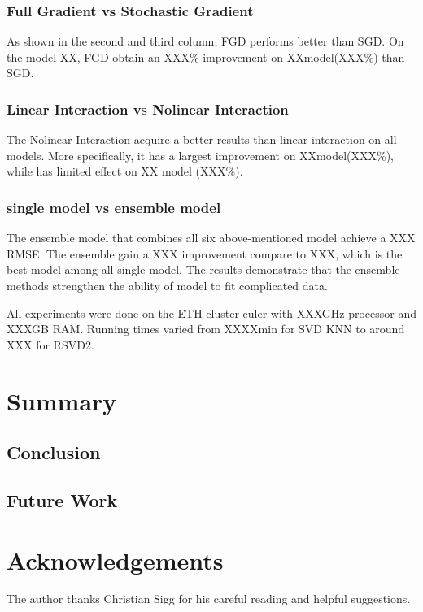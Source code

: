 \documentclass[10pt,conference,compsocconf]{IEEEtran}
\begin{document}
\subsubsection{Full Gradient vs Stochastic Gradient}
As shown in the second and third column, FGD performs better than SGD. On the model XX, FGD obtain an XXX\% improvement on XXmodel(XXX\%) than SGD. 

\subsubsection{Linear Interaction vs Nolinear Interaction}
The Nolinear Interaction acquire a better results than linear interaction on all models. More specifically, it has a largest improvement on XXmodel(XXX\%), while has limited effect on XX model (XXX\%).

\subsubsection{single model vs ensemble model}
The ensemble model that combines all six above-mentioned model achieve a XXX RMSE. The ensemble gain a XXX improvement compare to XXX, which is the best model among all single model. The results demonstrate that the ensemble methods strengthen the ability of model to fit complicated data.


All experiments were done on the ETH cluster euler with XXXGHz processor and XXXGB RAM. Running times varied from XXXXmin for SVD KNN to around XXX for RSVD2.

\section{Summary}
\subsection{Conclusion}
\subsection{Future Work} 



\section*{Acknowledgements}
The author thanks Christian Sigg for his careful reading and helpful
suggestions.



\end{document}
